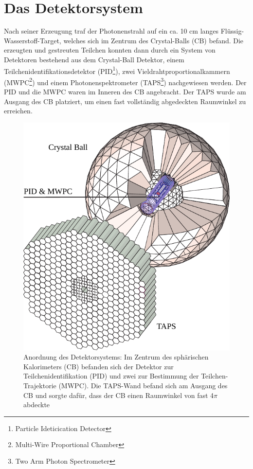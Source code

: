 \documentclass[a4paper,11pt,oneside,final,german,openbib,pdftex]{scrbook}
\begin{document}
{\section{Das Detektorsystem}
Nach seiner Erzeugung traf der Photonenstrahl auf ein ca. 10 cm langes Flüssig-Wasserstoff-Target, welches sich im Zentrum des Crystal-Balls (CB) befand. Die erzeugten und gestreuten Teilchen konnten dann durch ein System von Detektoren bestehend aus dem Crystal-Ball Detektor, einem Teilchenidentifikationsdetektor (PID\footnote{Particle Ideticication Detector}), zwei Vieldrahtproportionalkammern (MWPC\footnote{Multi-Wire Proportional Chamber}) und einem Photonenspektrometer (TAPS\footnote{Two Arm  Photon Spectrometer}) nachgewiesen werden. Der PID und die MWPC waren im Inneren des CB angebracht. Der TAPS wurde am Ausgang des CB platziert, um einen fast vollständig abgedeckten Raumwinkel zu erreichen.
\begin{figure}[h!]
	\begin{center}
		\includegraphics{crystal_ball}
	
		\caption{Anordnung des Detektorsystems: Im Zentrum des sph\"arischen Kalorimeters (CB) befanden sich der Detektor zur Teilchenidentifikation (PID) und zwei zur Bestimmung der Teilchen-Trajektorie (MWPC). Die TAPS-Wand befand sich am Ausgang des CB und sorgte daf\"ur, dass der CB einen Raumwinkel von fast 4$\pi$ abdeckte\cite{We13}}
		\label{[fig.crystal_ball]}	
\end{center}
\end{figure}

}
\end{document}
